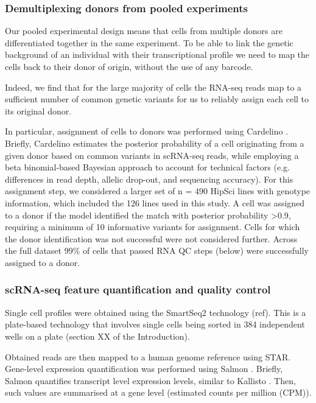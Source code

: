 \subsubsection{Demultiplexing donors from pooled experiments} 

Our pooled experimental design means that cells from multiple donors are differentiated together in the same experiment. 
To be able to link the genetic background of an individual with their transcriptional profile we need to map the cells back to their donor of origin, without the use of any barcode.

Indeed, we find that for the large majority of cells the RNA-seq reads map to a sufficient number of common genetic variants for us to reliably assign each cell to its original donor.

In particular, assignment of cells to donors was performed using Cardelino \cite{mccarthy2020cardelino}. 
Briefly, Cardelino estimates the posterior probability of a cell originating from a given donor based on common variants in scRNA-seq reads, while employing a beta binomial-based Bayesian approach to account for technical factors (e.g. differences in read depth, allelic drop-out, and sequencing accuracy). 
For this assignment step, we considered a larger set of n = 490 HipSci lines with genotype information, which included the 126 lines used in this study. 
A cell was assigned to a donor if the model identified the match with posterior probability >0.9, requiring a minimum of 10 informative variants for assignment. 
Cells for which the donor identification was not successful were not considered further.
Across the full dataset 99\% of cells that passed RNA QC steps (below) were successfully assigned to a donor.

\subsubsection{scRNA-seq feature quantification and quality control}

Single cell profiles were obtained using the SmartSeq2 technology (ref). 
This is a plate-based technology that involves single cells being sorted in 384 independent wells on a plate (section XX of the Introduction). 

Obtained reads are then mapped to a human genome reference using STAR. 
Gene-level expression quantification was performed using Salmon \cite{patro2017salmon}. 
Briefly, Salmon quantifies transcript level expression levels, similar to Kallisto \cite{bray2016near}.
Then, such values are summarised at a gene level (estimated counts per million (CPM)).

